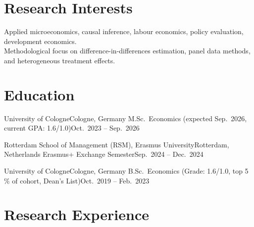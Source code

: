 \documentclass[serif]{../shared/OpenCV}
\begin{document}
\cvheader


\section*{Research Interests}
\small
Applied microeconomics, causal inference, labour economics, policy evaluation, development economics. \\
Methodological focus on difference-in-differences estimation, panel data methods, and heterogeneous treatment effects.

\section*{Education}
\resumeSubHeadingListStart

\resumeSubheading
{University of Cologne}{Cologne, Germany}
{M.Sc.\ Economics (expected Sep.\ 2026, current GPA: 1.6/1.0)}{Oct.\ 2023 -- Sep.\ 2026}
\resumeItemListStart
{}
\resumeItemListEnd

\resumeSubheading
{Rotterdam School of Management (RSM), Erasmus University}{Rotterdam, Netherlands}
{Erasmus+ Exchange Semester}{Sep.\ 2024 -- Dec.\ 2024}
\resumeItemListStart
{}
\resumeItemListEnd

\resumeSubheading
{University of Cologne}{Cologne, Germany}
{B.Sc.\ Economics (Grade: 1.6/1.0, top 5\,\% of cohort, Dean's List)}{Oct.\ 2019 -- Feb.\ 2023}

\resumeSubHeadingListEnd

\section*{Research Experience}
\resumeSubHeadingListStart
\end{document}
